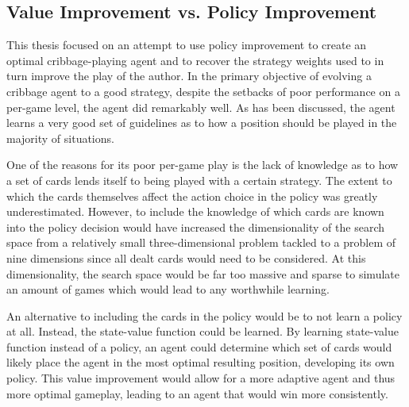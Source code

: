 

\subsection{Value Improvement vs. Policy Improvement}

This thesis focused on an attempt to use policy improvement to create an optimal
cribbage-playing agent and to recover the strategy weights used to in turn
improve the play of the author.
%
In the primary objective of evolving a cribbage agent to a good strategy,
despite the setbacks of poor performance on a per-game level,
the agent did remarkably well.
%
As has been discussed,
the agent learns a very good set of guidelines as to how a position should
be played in the majority of situations.

One of the reasons for its poor per-game play
is the lack of knowledge as to how a set of cards lends itself to being played
with a certain strategy.
%
The extent to which the cards themselves affect the action choice in the policy
was greatly underestimated.
%
However, %
to include the knowledge of which cards are known into the policy decision
would have increased the dimensionality of the search space from a relatively
small three-dimensional problem tackled to a problem of nine dimensions since
all dealt cards would need to be considered.
%
At this dimensionality,
the search space would be far too massive and sparse to simulate an amount of
games which would lead to any worthwhile learning.

An alternative to including the cards in the policy would be to not learn a
policy at all.
%
Instead,
the state-value function could be learned.
%
By learning state-value function instead of a policy,
an agent could determine which set of cards would likely place the agent in the
most optimal resulting position,
developing its own policy.
%
This value improvement would allow for a more adaptive agent and thus more
optimal gameplay,
leading to an agent that would win more consistently.

%
